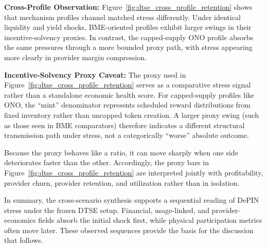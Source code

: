 \noindent\textbf{Cross-Profile Observation:} Figure~\ref{fig:dtse_cross_profile_retention} shows that mechanism profiles channel matched stress differently. Under identical liquidity and yield shocks, BME-oriented profiles exhibit larger swings in their incentive-solvency proxies. In contrast, the capped-supply ONO profile absorbs the same pressures through a more bounded proxy path, with stress appearing more clearly in provider margin compression.

\noindent\textbf{Incentive-Solvency Proxy Caveat:} The proxy used in Figure~\ref{fig:dtse_cross_profile_retention} serves as a comparative stress signal rather than a standalone economic health score. For capped-supply profiles like ONO, the ``mint'' denominator represents scheduled reward distributions from fixed inventory rather than uncapped token creation. A larger proxy swing (such as those seen in BME comparators) therefore indicates a different structural transmission path under stress, not a categorically ``worse'' absolute outcome.

Because the proxy behaves like a ratio, it can move sharply when one side deteriorates faster than the other. Accordingly, the proxy bars in Figure~\ref{fig:dtse_cross_profile_retention} are interpreted jointly with profitability, provider churn, provider retention, and utilization rather than in isolation.

In summary, the cross-scenario synthesis supports a sequential reading of DePIN stress under the frozen DTSE setup. Financial, usage-linked, and provider-economics fields absorb the initial shock first, while physical participation metrics often move later. These observed sequences provide the basis for the discussion that follows.
